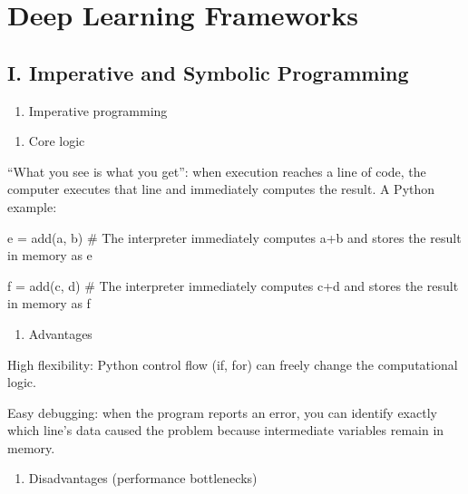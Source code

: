 \setcounter{section}{1}

\hypertarget{deep-learning-frameworks}{%
\section{Deep Learning Frameworks}\label{deep-learning-frameworks}}

\hypertarget{i.-imperative-and-symbolic-programming}{%
\subsection{I. Imperative and Symbolic Programming}\label{i.-imperative-and-symbolic-programming}}

\begin{enumerate}
\def\labelenumi{\arabic{enumi}.}
\tightlist
\item
  Imperative programming
\end{enumerate}

\begin{enumerate}
\def\labelenumi{(\arabic{enumi})}
\tightlist
\item
  Core logic
\end{enumerate}

``What you see is what you get'': when execution reaches a line of code, the computer executes that line and immediately computes the result. A Python example:

e = add(a, b) \# The interpreter immediately computes a+b and stores the result in memory as e

f = add(c, d) \# The interpreter immediately computes c+d and stores the result in memory as f

\begin{enumerate}
\def\labelenumi{(\arabic{enumi})}
\setcounter{enumi}{1}
\tightlist
\item
  Advantages
\end{enumerate}

High flexibility: Python control flow (if, for) can freely change the computational logic.

Easy debugging: when the program reports an error, you can identify exactly which line's data caused the problem because intermediate variables remain in memory.

\begin{enumerate}
\def\labelenumi{(\arabic{enumi})}
\setcounter{enumi}{2}
\tightlist
\item
  Disadvantages (performance bottlenecks)
\end{enumerate}

